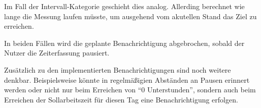 Im Fall der Intervall-Kategorie geschieht dies analog.
Allerding berechnet wie lange die Messung laufen müsste,
um ausgehend vom akutellen Stand das Ziel zu erreichen.

In beiden Fällen wird die geplante Benachrichtigung abgebrochen,
sobald der Nutzer die Zeiterfassung pausiert.

Zusätzlich zu den implementierten Benachrichtigungen sind noch weitere denkbar.
Beispielsweise könnte in regelmäßigien Abständen an Pausen erinnert werden
oder nicht nur beim Erreichen von \enquote{0 Unterstunden},
sondern auch beim Erreichen der Sollarbeitszeit für diesen Tag eine Benachrichtigung erfolgen.